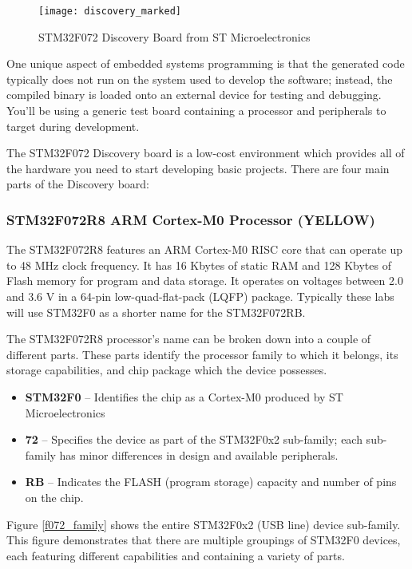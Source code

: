 \documentclass[openany,11pt,fleqn]{book} %
\begin{document}
\begin{figure}[h]
	\centering\texttt{[image: discovery\_marked]}
	\caption{STM32F072 Discovery Board from ST Microelectronics}
\end{figure}

One unique aspect of embedded systems programming is that the generated code typically does not run on the system used to develop the software; instead, the compiled binary is loaded onto an external device for testing and debugging. You'll be using a generic test board containing a processor and peripherals to target during development. 

The STM32F072 Discovery board is a low-cost environment which provides all of the hardware you need to start developing basic projects. There are four main parts of the Discovery board: 

\subsubsection*{STM32F072R8 ARM Cortex-M0 Processor ({\color{yellow!80!black}YELLOW})}
The STM32F072R8 features an ARM Cortex-M0 RISC core that can operate up to 48 MHz clock frequency. It has 16 Kbytes of static RAM and 128 Kbytes of Flash memory for program and data storage. It operates on voltages between 2.0 and 3.6 V in a 64-pin low-quad-flat-pack (LQFP) package. Typically these labs will use STM32F0 as a shorter name for the STM32F072RB.

The STM32F072R8 processor's name can be broken down into a couple of different parts. These parts identify the processor family to which it belongs, its storage capabilities, and chip package which the device possesses.

\begin{itemize}
    \item \textbf{STM32F0} -- Identifies the chip as a Cortex-M0 produced by ST Microelectronics
    \item \textbf{72} -- Specifies the device as part of the STM32F0x2 sub-family; each sub-family has minor differences in design and available peripherals.
    \item \textbf{RB} -- Indicates the FLASH (program storage) capacity and number of pins on the chip.  
\end{itemize} 
Figure \ref{f072_family} shows the entire STM32F0x2 (USB line) device sub-family. This figure demonstrates that there are multiple groupings of STM32F0 devices, each featuring different capabilities and containing a variety of parts.
\end{document}
